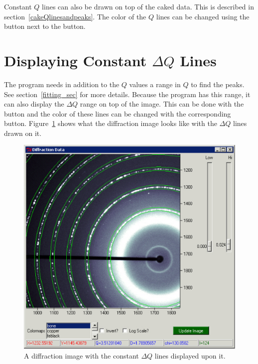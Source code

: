 Constant $Q$ lines can also be drawn on top of the
caked data. This is described in 
section~\ref{cakeQlinesandpeaks}.  
The color of the $Q$ lines can be changed using the
 button next to the  
button.

\section{\texorpdfstring{Displaying Constant $\Delta Q$ 
        Lines}{Displaying Constant delta Q Lines}}
        \label{displayconstdQlines}
        

The program needs in addition to the $Q$ values
a range in $Q$ to find the peaks. See 
section~\ref{fitting_sec} for more details. Because
the program has this range, it can also display the
$\Delta Q$ range on top of the image.
This can be done with the  button
and the color of these lines can be changed with the
corresponding  button. 
Figure~\ref{constant_dq_lines_on_diffraction_image}
shows what the diffraction image looks like with
the $\Delta Q$ lines drawn on it.

\begin{figure}
    \centering
    \includegraphics[scale=.75]{figures/constant_dq_lines_on_diffraction_image.eps}
    \caption{A diffraction image with the constant 
    $\Delta Q$ lines displayed upon it.}
    \label{constant_dq_lines_on_diffraction_image}
\end{figure}


